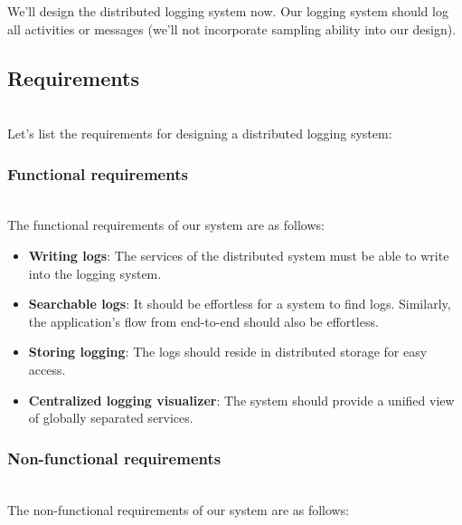 

We'll design the distributed logging system now. Our logging system should log all activities or messages (we'll not incorporate sampling ability into our design).

\subsection{Requirements}\label{kTa1KW306-JF2wjlKZIU8}
\\
Let's list the requirements for designing a distributed logging system:

\subsubsection{Functional requirements}\label{NAVvSH5Pk1Z2ZfV-Wnhwl}
\\
The functional requirements of our system are as follows:

\begin{itemize}
\item
\protect{}\label{W4Jpg2Q9CTLEGRZ_XqOoI}
\textbf{Writing logs}: The services of the distributed system must be able to write into the logging system.
\item
\protect{}\label{-bwcr33oCMvbeW5PDoM3T}
\textbf{Searchable logs}: It should be effortless for a system to find logs. Similarly, the application's flow from end-to-end should also be effortless.
\item
\protect{}\label{GYYXwiN1ENOm2lpTigPd7}
\textbf{Storing logging}: The logs should reside in distributed storage for easy access.
\item
\protect{}\label{1_qRswxoNFYOmhcLm3W22}
\textbf{Centralized logging visualizer}: The system should provide a unified view of globally separated services.
\end{itemize}

\subsubsection{Non-functional requirements}\label{3nkbDFBrrPar9rUQMiEV-}
\\
The non-functional requirements of our system are as follows:

